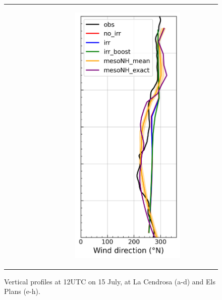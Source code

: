 \begin{figure}[hbtp]
{\begin{tabular}{@{}cccc@{}}
\begin{subfigure}[t]{0.283\textwidth}
        \end{subfigure} &
        \begin{subfigure}[t]{0.283\textwidth}
            \caption{}
            \includegraphics[width=\textwidth]{images/chap5/profiles/profile_elsplans_wind_direction_1507_.png}
        \end{subfigure} \\
    \end{tabular}
    }
    \caption{Vertical profiles at 12UTC on 15 July, at La Cendrosa (a-d) and Els Plans (e-h).}
    \label{fig:profiles_cendrosa_1507}
\end{figure}

